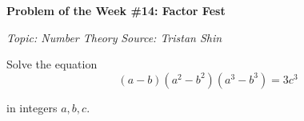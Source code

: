 \begin{potw}\vspace{5pt}
{\large\textbf{Problem of the Week \#14: Factor Fest}}\vspace{5pt}

\textit{Topic: Number Theory}\newline
\textit{Source: Tristan Shin}\V

Solve the equation 
\[(a-b)(a^2-b^2)(a^3-b^3) = 3c^3\]

in integers $a,b,c$.
\end{potw}\V
